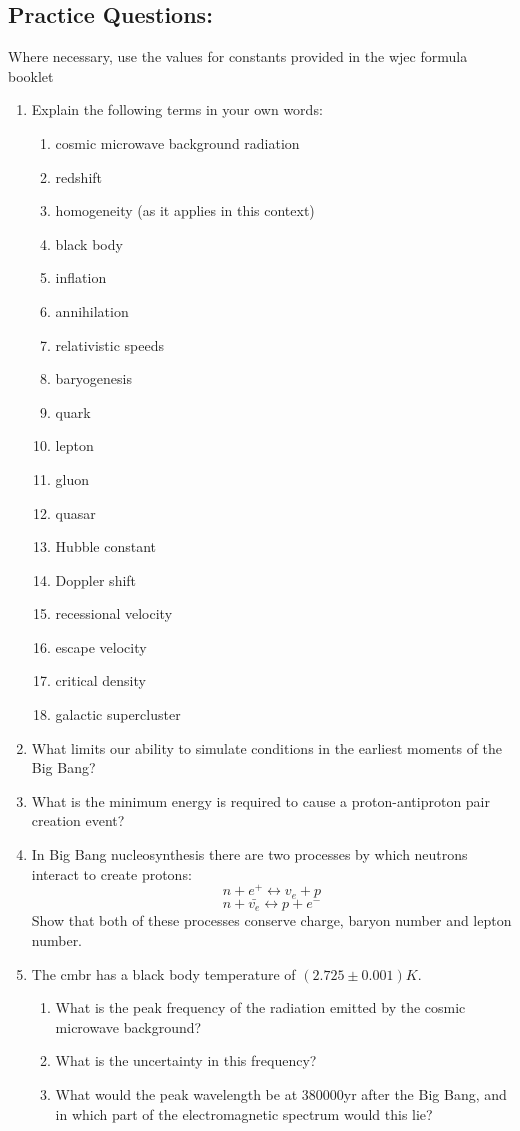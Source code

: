 \documentclass{tufte-handout}
\begin{document}
\begin{fullwidth}
\newpage
\section{Practice Questions:}
Where necessary, use the values for constants provided in the wjec formula booklet
\begin{enumerate}
\item Explain the following terms in your own words: 
\begin{enumerate}
\item cosmic microwave background radiation 
\item redshift \item homogeneity (as it applies in this context) \item black body \item inflation \item annihilation \item relativistic speeds \item baryogenesis \item quark \item lepton \item gluon \item quasar \item Hubble constant \item Doppler shift \item recessional velocity \item escape velocity 
\item critical density 
\item galactic supercluster 
\end{enumerate}
\item What limits our ability to simulate conditions in the earliest moments of the Big Bang? 
\item What is the minimum energy is required to cause a proton-antiproton pair creation event?
\item In Big Bang nucleosynthesis there are two processes by which neutrons interact to create protons: \[n+e^{+} \leftrightarrow v_{e} + p\] \[n + \bar{v_{e}} \leftrightarrow p+e^{-}\] 
Show that both of these processes conserve charge, baryon number and lepton number. 
\item The cmbr has a black body temperature of $(2.725 \pm 0.001)K.$
\begin{enumerate}
\item What is the peak frequency of the radiation emitted by the cosmic microwave background? 
\item What is the uncertainty in this frequency? 
\item What would the peak wavelength be at 380000yr after the Big Bang, and in which part of the electromagnetic spectrum would this lie? 
\end{enumerate}


\end{enumerate}
\end{fullwidth}
\end{document}
